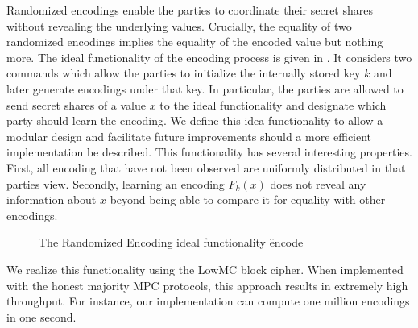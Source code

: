 Randomized encodings enable the parties to coordinate their secret shares without revealing the underlying values. Crucially, the equality  of two randomized encodings implies the equality of the encoded value but nothing more. The ideal functionality of the encoding process is given in . It considers two commands which allow the parties to initialize the internally stored key $k$ and later generate encodings under that key. In particular, the parties are allowed to send secret shares of a value $x$  to the ideal functionality and designate which party should learn the encoding. 
\iffullversion
 We define this idea functionality to allow a modular design and facilitate future improvements should a more efficient implementation be described. This functionality has several interesting properties. First, all encoding that have not been observed are uniformly distributed in that parties view. Secondly, learning an encoding $F_k(x)$ does not reveal any information about $x$ beyond being able to compare it for equality with other encodings.
\fi

\begin{figure}[ht]
	\caption{The Randomized Encoding ideal functionality \f{encode}}
	\label{fig:randomized-encode-ideal}	
\end{figure}


We realize this functionality using the LowMC block cipher\cite{lowmc}. When implemented with the honest majority MPC protocols\cite{aby3, highthroughput}, this approach results in extremely high throughput. For instance, our implementation can compute one million encodings in one second.

